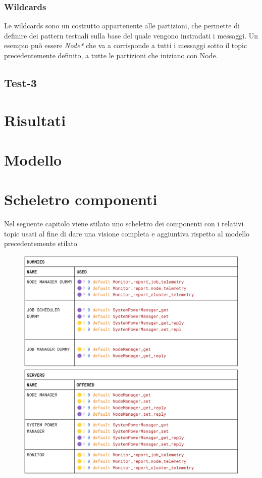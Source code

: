 \subsubsection{Wildcards}
Le wildcards sono un costrutto appartenente alle partizioni, che permette di definire dei pattern testuali sulla base del quale vengono instradati i messaggi. Un esempio può essere \textit{Node*} che va a corrisponde a tutti i messaggi sotto il topic precedentemente definito, a tutte le partizioni che iniziano con Node.

\begin{figure}[H]
    \centering
\end{figure}


\subsection{Test-3}

\section{Risultati}

\section{Modello}

\section{Scheletro componenti}
Nel seguente capitolo viene stilato uno scheletro dei componenti con i relativi topic usati al fine di dare una visione completa e aggiuntiva rispetto al modello precedentemente stilato  
\begin{figure}[H]
    \centering
    \includegraphics[width=\textwidth]{./img/dummies_skeleton.png}
    \includegraphics[width=\textwidth]{./img/server_skeleton.png}
\end{figure}
